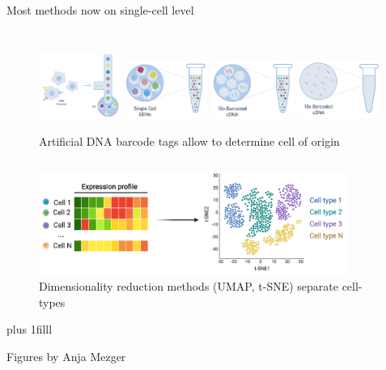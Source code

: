 \documentclass[10pt]{beamer}
\newcommand{\credit}[1]{{\vskip0pt plus 1filll \par \raggedleft \scriptsize \mdseries \color{mDarkBrown} #1 \par}}
\begin{document}
\begin{frame}{Most methods now on single-cell level}
	\begin{columns}[T]
		\column{\dimexpr\paperwidth-10pt}
		\begin{figure}
			\includegraphics[width=0.24\textwidth]{./figures/single-cell-B-oil.png}
			\includegraphics[width=0.24\textwidth]{./figures/single-cell-B-oil2.png}
			\includegraphics[width=0.24\textwidth]{./figures/single-cell-B-oil3.png}
			\includegraphics[width=0.24\textwidth]{./figures/single-cell-B-oil4.png}
			\caption{Artificial DNA barcode tags allow to determine cell of origin}
		\end{figure}
	\end{columns}
	\begin{figure}
		\includegraphics[width=0.9\textwidth]{./figures/single-cell4.png}
		\caption{Dimensionality reduction methods (UMAP, t-SNE) separate cell-types}
	\end{figure}
	\credit{Figures by Anja Mezger}
\end{frame}
\end{document}
